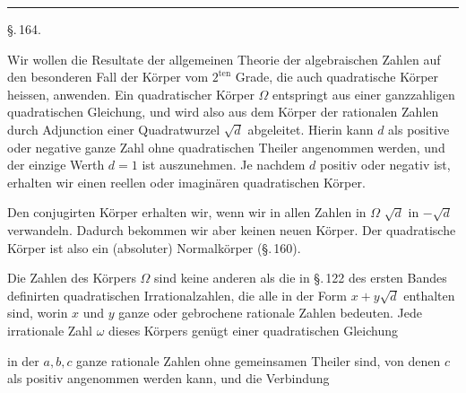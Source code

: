 \begin{center}

\end{center}

\begin{center}
\rule{0.2\linewidth}{0.4pt}
\end{center}

\begin{center}
\S.\,164.

\end{center}

Wir wollen die Resultate der allgemeinen Theorie der algebraischen Zahlen auf den besonderen Fall der Körper vom
$2^{\text{ten}}$ Grade, die auch quadratische Körper heissen, anwenden.
Ein quadratischer Körper $\Omega$ entspringt aus einer ganzzahligen
quadratischen Gleichung, und wird also aus dem Körper der
rationalen Zahlen durch Adjunction einer Quadratwurzel $\sqrt{d}$ abgeleitet.
Hierin kann $d$ als positive oder negative ganze Zahl
ohne quadratischen Theiler angenommen werden, und der einzige
 Werth $d = 1$ ist auszunehmen. Je nachdem $d$ positiv oder
negativ ist, erhalten wir einen reellen oder imaginären quadratischen
 Körper.

Den conjugirten Körper erhalten wir, wenn wir in allen
Zahlen in $\Omega$ $\sqrt{d}$ in $-\sqrt{d}$ verwandeln. Dadurch bekommen wir
aber keinen neuen Körper. Der quadratische Körper ist also
ein (absoluter) Normalkörper (\S.\,160).

Die Zahlen des Körpers $\Omega$ sind keine anderen als die in
\S.\,122 des ersten Bandes definirten quadratischen Irrationalzahlen,
die alle in der Form $x + y\sqrt{d}$ enthalten sind, worin
$x$ und $y$ ganze oder gebrochene rationale Zahlen bedeuten. Jede
irrationale Zahl $\omega$ dieses Körpers genügt einer quadratischen
Gleichung


in der $a, b, c$ ganze rationale Zahlen ohne gemeinsamen Theiler
sind, von denen $c$ als positiv angenommen werden kann, und
die Verbindung

